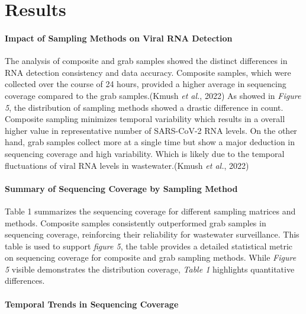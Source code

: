 \documentclass[
]{article}
\begin{document}
\hypertarget{results}{%
\section{Results}\label{results}}

\hypertarget{impact-of-sampling-methods-on-viral-rna-detection}{%
\paragraph{Impact of Sampling Methods on Viral RNA
Detection}\label{impact-of-sampling-methods-on-viral-rna-detection}}

The analysis of composite and grab samples showed the distinct
differences in RNA detection consistency and data accuracy. Composite
samples, which were collected over the course of 24 hours, provided a
higher average in sequencing coverage compared to the grab
samples.(Kmush \emph{et al.}, 2022) As showed in \emph{Figure 5}, the
distribution of sampling methods showed a drastic difference in count.
Composite sampling minimizes temporal variability which results in a
overall higher value in representative number of SARS-CoV-2 RNA levels.
On the other hand, grab samples collect more at a single time but show a
major deduction in sequencing coverage and high variability. Which is
likely due to the temporal fluctuations of viral RNA levels in
wastewater.(Kmush \emph{et al.}, 2022)

\hypertarget{summary-of-sequencing-coverage-by-sampling-method}{%
\paragraph{Summary of Sequencing Coverage by Sampling
Method}\label{summary-of-sequencing-coverage-by-sampling-method}}

Table 1 summarizes the sequencing coverage for different sampling
matrices and methods. Composite samples consistently outperformed grab
samples in sequencing coverage, reinforcing their reliability for
wastewater surveillance. This table is used to support \emph{figure 5},
the table provides a detailed statistical metric on sequencing coverage
for composite and grab sampling methods. While \emph{Figure 5} visible
demonstrates the distribution coverage, \emph{Table 1} highlights
quantitative differences.

\hypertarget{temporal-trends-in-sequencing-coverage}{%
\paragraph{Temporal Trends in Sequencing
Coverage}\label{temporal-trends-in-sequencing-coverage}}
\end{document}
